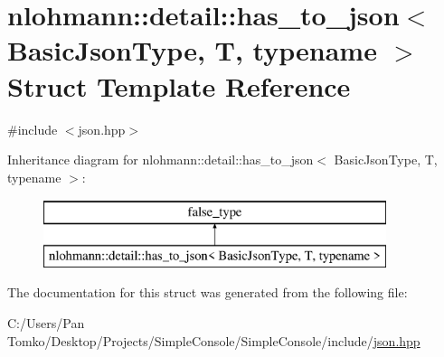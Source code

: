 \hypertarget{structnlohmann_1_1detail_1_1has__to__json}{}\section{nlohmann\+::detail\+::has\+\_\+to\+\_\+json$<$ Basic\+Json\+Type, T, typename $>$ Struct Template Reference}
\label{structnlohmann_1_1detail_1_1has__to__json}


{\ttfamily \#include $<$json.\+hpp$>$}

Inheritance diagram for nlohmann\+::detail\+::has\+\_\+to\+\_\+json$<$ Basic\+Json\+Type, T, typename $>$\+:\begin{figure}[H]
\begin{center}
\leavevmode
\includegraphics[height=2.000000cm]{d9/d6c/structnlohmann_1_1detail_1_1has__to__json}
\end{center}
\end{figure}


The documentation for this struct was generated from the following file\+:\begin{DoxyCompactItemize}
\item 
C\+:/\+Users/\+Pan Tomko/\+Desktop/\+Projects/\+Simple\+Console/\+Simple\+Console/include/\mbox{\hyperlink{json_8hpp}{json.\+hpp}}\end{DoxyCompactItemize}
